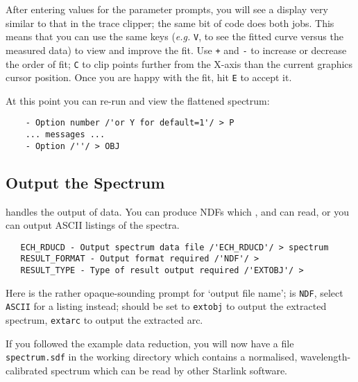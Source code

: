 After entering values for the parameter prompts, you will see a display
very similar to that in the trace clipper; the same bit of code does both
jobs.  This means that you can use the same keys ({\it{e.g.}} \verb+V+, to
see the fitted curve versus the measured data) to view and improve the fit.
Use \verb=+= and \verb=-= to increase or decrease the order of fit; \verb+C+
to clip points further from the X-axis than the current graphics cursor
position.  Once you are happy with the fit, hit \verb+E+ to accept it.

At this point you can re-run
and view the flattened spectrum:

{
\scspec{\small}{ }
\begin{verbatim}
    - Option number /'or Y for default=1'/ > P
    ... messages ...
    - Option /''/ > OBJ
\end{verbatim}
}


\subsection{Output the Spectrum}

handles the output of data.
You can produce NDFs which \cite{dipso},
 and  can read,
or you can output ASCII listings of the spectra.

{
\scspec{\small}{ }
\begin{verbatim}
   ECH_RDUCD - Output spectrum data file /'ECH_RDUCD'/ > spectrum
   RESULT_FORMAT - Output format required /'NDF'/ >
   RESULT_TYPE - Type of result output required /'EXTOBJ'/ >
\end{verbatim}
}

Here
 is the rather opaque-sounding
prompt for `output file name';
 is \verb+NDF+,
select \verb+ASCII+ for a listing instead;
 should be set to
\verb+extobj+ to output the extracted spectrum, \verb+extarc+ to output
the extracted arc.

If you followed the example data reduction, you will now have a file
\verb+spectrum.sdf+ in the working directory which contains a normalised,
wavelength-calibrated spectrum which can be read by other Starlink
software.




